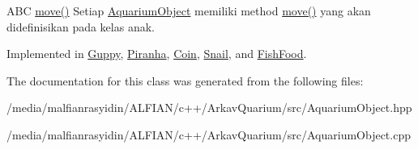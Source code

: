 A\+BC \mbox{\hyperlink{class_aquarium_object_a42c4de640f89ac8aebc26b7618578575}{move()}} Setiap \mbox{\hyperlink{class_aquarium_object}{Aquarium\+Object}} memiliki method \mbox{\hyperlink{class_aquarium_object_a42c4de640f89ac8aebc26b7618578575}{move()}} yang akan didefinisikan pada kelas anak. 

Implemented in \mbox{\hyperlink{class_guppy_ae6002948d74b3741bed34a7311be4377}{Guppy}}, \mbox{\hyperlink{class_piranha_a6b86e73b3e5a57ee0fdb768c24ab9b67}{Piranha}}, \mbox{\hyperlink{class_coin_ab62bca5834489b9b483deaa3ca3470e9}{Coin}}, \mbox{\hyperlink{class_snail_af5892ec122d9199480c813b74488256b}{Snail}}, and \mbox{\hyperlink{class_fish_food_a411070d0e4f5c964ff34ca17fca0ec05}{Fish\+Food}}.



The documentation for this class was generated from the following files\+:\begin{DoxyCompactItemize}
\item 
/media/malfianrasyidin/\+A\+L\+F\+I\+A\+N/c++/\+Arkav\+Quarium/src/Aquarium\+Object.\+hpp\item 
/media/malfianrasyidin/\+A\+L\+F\+I\+A\+N/c++/\+Arkav\+Quarium/src/Aquarium\+Object.\+cpp\end{DoxyCompactItemize}
